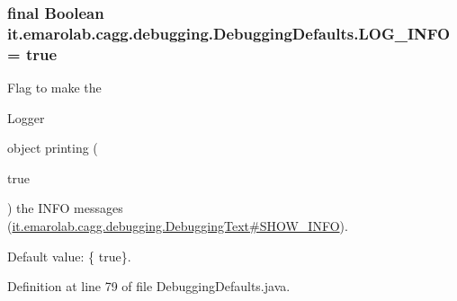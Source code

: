 \hypertarget{classit_1_1emarolab_1_1cagg_1_1debugging_1_1DebuggingDefaults_a029fcf850c3dd1c1aed7c8bc0620ed8a}{
\subsubsection[{L\-O\-G\-\_\-\-I\-N\-F\-O}]{\setlength{\rightskip}{0pt plus 5cm}final Boolean it.\-emarolab.\-cagg.\-debugging.\-Debugging\-Defaults.\-L\-O\-G\-\_\-\-I\-N\-F\-O = true\hspace{0.3cm}{\ttfamily [static]}}}\label{classit_1_1emarolab_1_1cagg_1_1debugging_1_1DebuggingDefaults_a029fcf850c3dd1c1aed7c8bc0620ed8a}
Flag to make the
\begin{DoxyCode}
Logger 
\end{DoxyCode}
 object printing (
\begin{DoxyCode}
\textcolor{keyword}{true} 
\end{DoxyCode}
 ) the I\-N\-F\-O messages (\hyperlink{}{it.\-emarolab.\-cagg.\-debugging.\-Debugging\-Text\#\-S\-H\-O\-W\-\_\-\-I\-N\-F\-O}).\par
 Default value\-: \{ true\}. 

Definition at line 79 of file Debugging\-Defaults.\-java.

